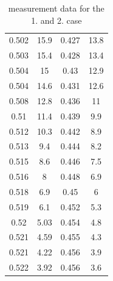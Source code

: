 \documentclass[a4paper, 12pt]{scrartcl}
\begin{document}
\begin{table}[H]
\begin{tabular}{|c|c|c|c|}
0.502&		15.9	&	0.427	&	13.8\\
0.503&		15.4	&	0.428	&	13.4\\
0.504&		15	&	0.43		  &      12.9\\
0.504&		14.6	&	0.431		&12.6\\
0.508&		12.8	&	0.436	&	11\\
0.51	&	        11.4	&	0.439	&	9.9\\
0.512&		10.3	&	0.442	&	8.9\\
0.513&		9.4	&	0.444	&	8.2\\
0.515&		8.6	&	0.446	&	7.5\\
0.516&		8	&	0.448	&	6.9\\
0.518&		6.9	&	0.45	&	        6\\
0.519&		6.1	&	0.452	&	5.3\\
0.52	&	        5.03	&	0.454	&	4.8\\
0.521&		4.59	&	0.455	&	4.3\\
0.521&		4.22	&	0.456	&	3.9\\
0.522&		3.92	&	0.456	&	3.6\\\hline\end{tabular}\caption{measurement data for the 1. and 2. case}\end{table}
\end{document}
